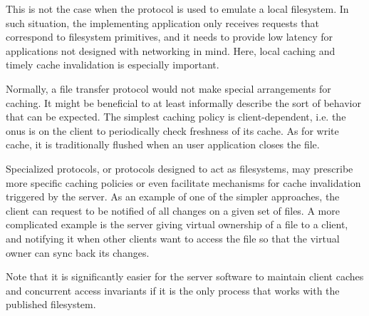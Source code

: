 This is not the case when the protocol is used to emulate a local filesystem. In such situation, the
implementing application only receives requests that correspond to filesystem primitives, and it needs to
provide low latency for applications not designed with networking in mind. Here, local caching and timely
cache invalidation is especially important.

Normally, a file transfer protocol would not make special arrangements for caching. It might be beneficial to
at least informally describe the sort of behavior that can be expected. The simplest caching policy is
client-dependent, i.e. the onus is on the client to periodically check freshness of its cache. As for write
cache, it is traditionally flushed when an user application closes the file.

Specialized protocols, or protocols designed to act as filesystems, may prescribe more specific caching
policies or even facilitate mechanisms for cache invalidation triggered by the server.  As an example of one
of the simpler approaches, the client can request to be notified of all changes on a given set of files.
A more complicated example is the server giving virtual ownership of a file to a client, and notifying it when
other clients want to access the file so that the virtual owner can sync back its changes.

Note that it is significantly easier for the server software to maintain client caches and concurrent access
invariants if it is the only process that works with the published filesystem.
